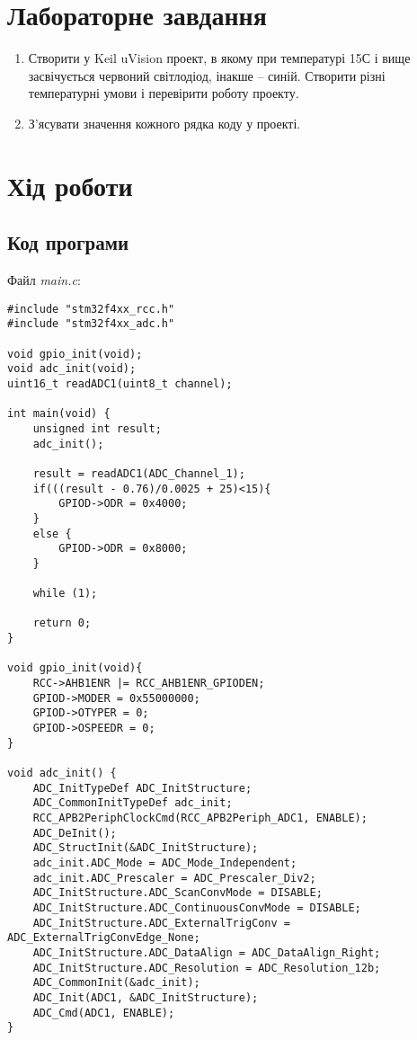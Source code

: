 \documentclass[oneside,14pt]{extarticle}
\begin{document}
\begin{normalsize}
    \section*{Лабораторне завдання}
    \begin{enumerate}
        \item Створити у Keil uVision проект, в якому при температурі 15С і вище засвічується червоний світлодіод, інакше – синій. Створити різні температурні умови і перевірити роботу проекту.
        \item З’ясувати значення кожного рядка коду у проекті. 
    \end{enumerate}

	\section*{Хід роботи}
	
	\subsection*{Код програми}
	Файл \textit{main.c}:
	{\small
		\begin{lstlisting}
#include "stm32f4xx_rcc.h"
#include "stm32f4xx_adc.h"

void gpio_init(void);
void adc_init(void); 
uint16_t readADC1(uint8_t channel); 

int main(void) {
	unsigned int result; 
	adc_init(); 
	
	result = readADC1(ADC_Channel_1); 
	if(((result - 0.76)/0.0025 + 25)<15){ 
		GPIOD->ODR = 0x4000; 
	} 
	else { 
		GPIOD->ODR = 0x8000; 
	} 
		
	while (1); 
		
	return 0;
}

void gpio_init(void){ 
	RCC->AHB1ENR |= RCC_AHB1ENR_GPIODEN; 
	GPIOD->MODER = 0x55000000; 
	GPIOD->OTYPER = 0;
	GPIOD->OSPEEDR = 0; 
}

void adc_init() { 
	ADC_InitTypeDef ADC_InitStructure; 
	ADC_CommonInitTypeDef adc_init; 
	RCC_APB2PeriphClockCmd(RCC_APB2Periph_ADC1, ENABLE); 
	ADC_DeInit(); 
	ADC_StructInit(&ADC_InitStructure); 
	adc_init.ADC_Mode = ADC_Mode_Independent; 
	adc_init.ADC_Prescaler = ADC_Prescaler_Div2; 
	ADC_InitStructure.ADC_ScanConvMode = DISABLE; 
	ADC_InitStructure.ADC_ContinuousConvMode = DISABLE; 
	ADC_InitStructure.ADC_ExternalTrigConv = ADC_ExternalTrigConvEdge_None;
	ADC_InitStructure.ADC_DataAlign = ADC_DataAlign_Right; 
	ADC_InitStructure.ADC_Resolution = ADC_Resolution_12b; 
	ADC_CommonInit(&adc_init); 
	ADC_Init(ADC1, &ADC_InitStructure); 
	ADC_Cmd(ADC1, ENABLE); 
} 


\end{lstlisting}}
\end{normalsize}
\end{document}
